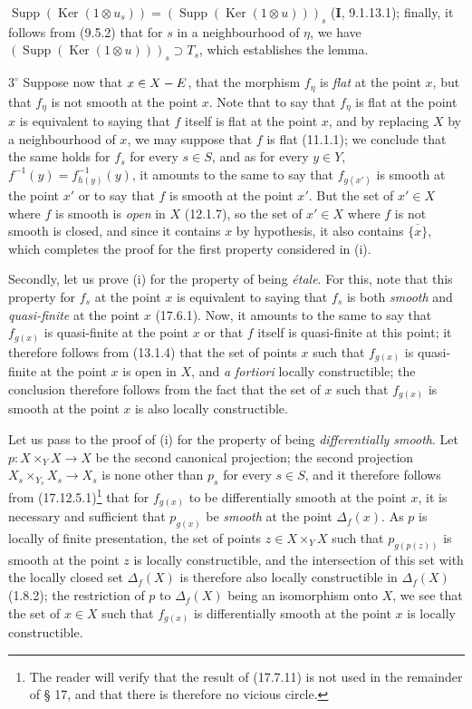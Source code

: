 
$\operatorname{Supp}(\operatorname{Ker}(1\otimes u_s))=(\operatorname{Supp}(\operatorname{Ker}(1\otimes u)))_s$ (\textbf{I}, 9.1.13.1); finally, it follows from (9.5.2) that for $s$ in a neighbourhood of $\eta$, we have $(\operatorname{Supp}(\operatorname{Ker}(1\otimes u)))_s\supset T_s$, which establishes the lemma.

$3^\circ$ Suppose now that $x\in X- E$, that the morphism $f_\eta$ is \emph{flat} at the point $x$, but that $f_\eta$ is not smooth at the point $x$. Note that to say that $f_\eta$ is flat at the point $x$ is equivalent to saying that $f$ itself is flat at the point $x$, and by replacing $X$ by a neighbourhood of $x$, we may suppose that $f$ is flat (11.1.1); we conclude that the same holds for $f_s$ for every $s\in S$, and as for every $y\in Y$, $f^{-1}(y)=f_{h(y)}^{-1}(y)$, it amounts to the same to say that $f_{g(x')}$ is smooth at the point $x'$ or to say that $f$ is smooth at the point $x'$. But the set of $x'\in X$ where $f$ is smooth is \emph{open} in $X$ (12.1.7), so the set of $x'\in X$ where $f$ is not smooth is closed, and since it contains $x$ by hypothesis, it also contains $\overline{\{x\}}$, which completes the proof for the first property considered in (i).

Secondly, let us prove (i) for the property of being \emph{étale}. For this, note that this property for $f_s$ at the point $x$ is equivalent to saying that $f_s$ is both \emph{smooth} and \emph{quasi-finite} at the point $x$ (17.6.1). Now, it amounts to the same to say that $f_{g(x)}$ is quasi-finite at the point $x$ or that $f$ itself is quasi-finite at this point; it therefore follows from (13.1.4) that the set of points $x$ such that $f_{g(x)}$ is quasi-finite at the point $x$ is open in $X$, and \emph{a fortiori} locally constructible; the conclusion therefore follows from the fact that the set of $x$ such that $f_{g(x)}$ is smooth at the point $x$ is also locally constructible.

Let us pass to the proof of (i) for the property of being \emph{differentially smooth}. Let $p:X\times_Y X\to X$ be the second canonical projection; the second projection $X_s\times_{Y_s}X_s\to X_s$ is none other than $p_s$ for every $s\in S$, and it therefore follows from (17.12.5.1)\footnote{The reader will verify that the result of (17.7.11) is not used in the remainder of § 17, and that there is therefore no vicious circle.} that for $f_{g(x)}$ to be differentially smooth at the point $x$, it is necessary and sufficient that $p_{g(x)}$ be \emph{smooth} at the point $\Delta_f(x)$. As $p$ is locally of finite presentation, the set of points $z\in X\times_Y X$ such that $p_{g(p(z))}$ is smooth at the point $z$ is locally constructible, and the intersection of this set with the locally closed set $\Delta_f(X)$ is therefore also locally constructible in $\Delta_f(X)$ (1.8.2); the restriction of $p$ to $\Delta_f(X)$ being an isomorphism onto $X$, we see that the set of $x\in X$ such that $f_{g(x)}$ is differentially smooth at the point $x$ is locally constructible.

